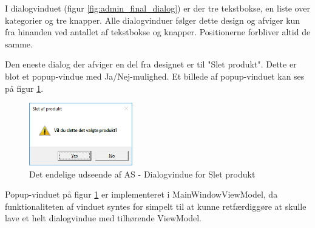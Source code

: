 I dialogvinduet (figur \ref{fig:admin_final_dialog}) er der tre tekstbokse, en liste over kategorier og tre knapper. Alle dialogvinduer følger dette design og afviger kun fra hinanden ved antallet af tekstbokse og knapper. Positionerne forbliver altid de samme.

Den eneste dialog der afviger en del fra designet er til "Slet produkt". Dette er blot et popup-vindue med Ja/Nej-mulighed. Et billede af popup-vinduet kan ses på figur \ref{fig:admin_final_sletprodukt}.

\begin{figure}[H]
	\centering
	\includegraphics[width=0.4\textwidth]{Systemdesign/backend/Images/AdminDesignSletProdukt}
	\caption{Det endelige udseende af \gls{AS} - Dialogvindue for Slet produkt}
	\label{fig:admin_final_sletprodukt}
\end{figure}

Popup-vinduet på figur \ref{fig:admin_final_sletprodukt} er implementeret i MainWindowViewModel, da funktionaliteten af vinduet syntes for simpelt til at kunne retfærdiggøre at skulle lave et helt dialogvindue med tilhørende ViewModel.